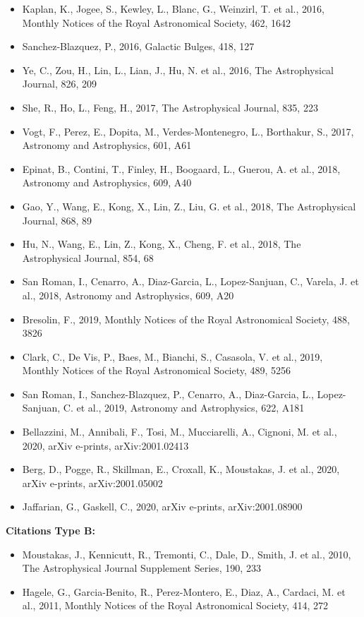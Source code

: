 \documentclass{letter}
\begin{document}
\begin{enumerate}
\begin{itemize}
\item Kaplan, K., Jogee, S., Kewley, L., Blanc, G., Weinzirl, T. et al., 2016, Monthly Notices of the Royal Astronomical Society, 462, 1642
\item Sanchez-Blazquez, P., 2016, Galactic Bulges, 418, 127
\item Ye, C., Zou, H., Lin, L., Lian, J., Hu, N. et al., 2016, The Astrophysical Journal, 826, 209
\item She, R., Ho, L., Feng, H., 2017, The Astrophysical Journal, 835, 223
\item Vogt, F., Perez, E., Dopita, M., Verdes-Montenegro, L., Borthakur, S., 2017, Astronomy and Astrophysics, 601, A61
\item Epinat, B., Contini, T., Finley, H., Boogaard, L., Guerou, A. et al., 2018, Astronomy and Astrophysics, 609, A40
\item Gao, Y., Wang, E., Kong, X., Lin, Z., Liu, G. et al., 2018, The Astrophysical Journal, 868, 89
\item Hu, N., Wang, E., Lin, Z., Kong, X., Cheng, F. et al., 2018, The Astrophysical Journal, 854, 68
\item San Roman, I., Cenarro, A., Diaz-Garcia, L., Lopez-Sanjuan, C., Varela, J. et al., 2018, Astronomy and Astrophysics, 609, A20
\item Bresolin, F., 2019, Monthly Notices of the Royal Astronomical Society, 488, 3826
\item Clark, C., De Vis, P., Baes, M., Bianchi, S., Casasola, V. et al., 2019, Monthly Notices of the Royal Astronomical Society, 489, 5256
\item San Roman, I., Sanchez-Blazquez, P., Cenarro, A., Diaz-Garcia, L., Lopez-Sanjuan, C. et al., 2019, Astronomy and Astrophysics, 622, A181
\item Bellazzini, M., Annibali, F., Tosi, M., Mucciarelli, A., Cignoni, M. et al., 2020, arXiv e-prints, arXiv:2001.02413
\item Berg, D., Pogge, R., Skillman, E., Croxall, K., Moustakas, J. et al., 2020, arXiv e-prints, arXiv:2001.05002
\item Jaffarian, G., Gaskell, C., 2020, arXiv e-prints, arXiv:2001.08900
\end{itemize}
{\bf Citations Type B:}
\begin{itemize}
\item Moustakas, J., Kennicutt, R., Tremonti, C., Dale, D., Smith, J. et al., 2010, The Astrophysical Journal Supplement Series, 190, 233
\item Hagele, G., Garcia-Benito, R., Perez-Montero, E., Diaz, A., Cardaci, M. et al., 2011, Monthly Notices of the Royal Astronomical Society, 414, 272

\end{itemize}
\end{enumerate}
\end{document}
